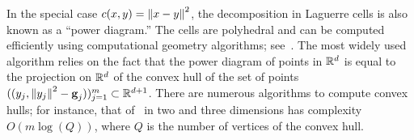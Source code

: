 In the special case $c(x,y)=\left\| x-y \right\|^2$, the decomposition in Laguerre cells is also known as a ``power diagram.'' 
%
The cells are polyhedral and can be computed efficiently using computational geometry algorithms; see~\citep{aurenhammer1987power}. 
%
The most widely used algorithm relies on the fact that the power diagram of points in $\mathbb{R}^d$ is equal to the projection on $\mathbb{R}^d$ of the convex hull of the set of points $( (y_j,\left\| y_j \right\|^2 - \mathrm{\textbf{g}}_j) )_{j=1}^m \subset \mathbb{R}^{d+1}$. There are numerous algorithms to compute convex hulls; for instance, that of~\citet{chan1996optimal} in two and three dimensions has complexity $O(m\log(Q))$, where $Q$ is the number of vertices of the convex hull.
%


